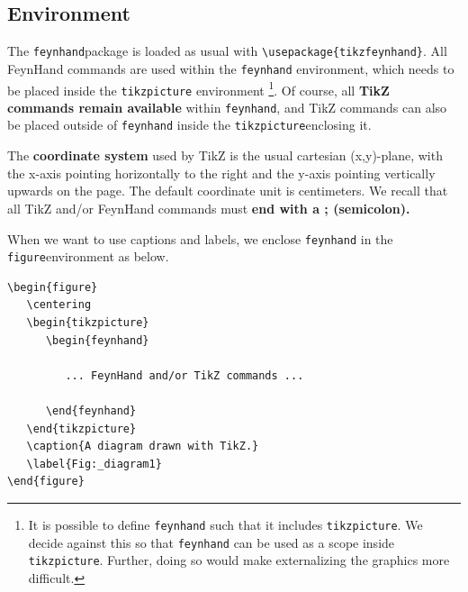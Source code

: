 \documentclass[10pt,letterpaper,twoside,notitlepage]{article}
\numberwithin{figure}{section}
\begin{document}
\subsection{Environment}
\label{sec:_feynmandiagrams_environment}
%
\noindent
The \blucol\verb$feynhand$\txcol package is loaded as usual
with \blucol\verb$\usepackage{tikzfeynhand}$\txcol.
All FeynHand commands are used within the \blucol\verb$feynhand$\txcol
environment, which needs to be placed inside the \blucol\verb$tikzpicture$\txcol
environment%
\footnote{It is possible to define \texttt{feynhand} such that it includes \texttt{tikzpicture}. 
	We decide against this so that \texttt{feynhand} 
	can be used as a scope inside \texttt{tikzpicture}.
	Further, doing so would make externalizing the graphics more difficult.}.
%
Of course, all \textbf{TikZ commands remain available} within \blucol\verb$feynhand$\txcol,
and TikZ commands can also be placed outside of \blucol\verb$feynhand$\txcol
inside the \blucol\verb$tikzpicture$\txcol enclosing it.

The \textbf{coordinate system} used by TikZ is the usual cartesian (x,y)-plane,
with the x-axis pointing horizontally to the right
and the y-axis pointing vertically upwards on the page.
The default coordinate unit is centimeters.
We recall that all TikZ and/or FeynHand commands must \textbf{end with
a \;;\; (semicolon).}

When we want to use captions and labels, we enclose \blucol\verb$feynhand$\txcol 
in the \blucol\verb$figure$\txcol environment as below.
%
\blucol\begin{verbatim}
\begin{figure}
   \centering
   \begin{tikzpicture}
      \begin{feynhand}

         ... FeynHand and/or TikZ commands ...

      \end{feynhand}
   \end{tikzpicture}
   \caption{A diagram drawn with TikZ.}
   \label{Fig:_diagram1}
\end{figure}
\end{verbatim}\txcol
%
\vspace{-5mm}
\end{document}
